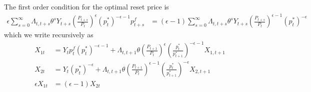 \documentclass[11pt]{article}
\begin{document}
The first order condition for the optimal reset price is
\begin{align*}
	\epsilon\sum_{s=0}^{\infty} \Lambda_{t,t+s} \theta^{s} Y_{t+s} \left(\frac{P_{t+s}}{P_t}\right)^{\epsilon}   (p_t^*)^{-\epsilon-1}  p^f_{t+s}
	&=(\epsilon-1)\sum_{s=0}^{\infty} \Lambda_{t,t+s}\theta^{s}Y_{t+s}\left(\frac{P_{t+s}}{P_t}\right)^{\epsilon-1}  (p_t^*)^{-\epsilon} 
\end{align*}
which we write recursively as
\begin{align*}
	X_{1t} & = Y_{t} p_{t}^f (p_t^*)^{-\epsilon-1} + \Lambda_{t,t+1} \theta  \left(\frac{P_{t+1}}{P_{t}}\right)^{\epsilon} \left(\frac{p_t^*}{p_{t+1}^*}\right)^{-\epsilon-1}  X_{1,t+1} \\ 
% 
	X_{2t} & =  Y_{t} (p_t^*)^{-\epsilon} + \Lambda_{t,t+1} \theta \left(\frac{P_{t+1}}{P_{t}}\right)^{\epsilon-1} \left(\frac{p_t^*}{p_{t+1}^*}\right)^{-\epsilon}  X_{2,t+1} \\ 
	\epsilon  X_{1t}&=(\epsilon-1)X_{2t}
\end{align*}
\end{document}
